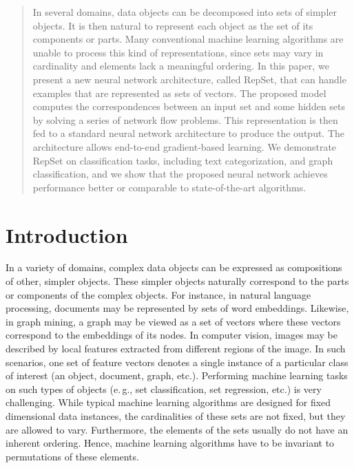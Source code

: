 \documentclass[twoside]{article}
\newcommand{\eg}{e.\,g., }
\begin{document}

\begin{abstract}
In several domains, data objects can be decomposed into sets of simpler objects.
It is then natural to represent each object as the set of its components or parts.
Many conventional machine learning algorithms are unable to process this kind of representations, since sets may vary in cardinality and elements lack a meaningful ordering.
In this paper, we present a new neural network architecture, called RepSet, that can handle examples that are represented as sets of vectors.
The proposed model computes the correspondences between an input set and some hidden sets by solving a series of network flow problems.
This representation is then fed to a standard neural network architecture to produce the output.
The architecture allows end-to-end gradient-based learning.
We demonstrate RepSet on classification tasks, including text categorization, and graph classification, and we show that the proposed neural network achieves performance better or comparable to state-of-the-art algorithms.
\end{abstract}

\section{Introduction}\label{introduction}
In a variety of domains, complex data objects can be expressed as compositions of other, simpler objects.
These simpler objects naturally correspond to the parts or components of the complex objects.
For instance, in natural language processing, documents may be represented by sets of word embeddings.
Likewise, in graph mining, a graph may be viewed as a set of vectors where these vectors correspond to the embeddings of its nodes.
In computer vision, images may be described by local features extracted from different regions of the image.
In such scenarios, one set of feature vectors denotes a single instance of a particular class of interest (an object, document, graph, etc.).
Performing machine learning tasks on such types of objects (\eg set classification, set regression, etc.) is very challenging.
While typical machine learning algorithms are designed for fixed dimensional data instances, the cardinalities of these sets are not fixed, but they are allowed to vary.
Furthermore, the elements of the sets usually do not have an inherent ordering.
Hence, machine learning algorithms have to be invariant to permutations of these elements.
\end{document}
